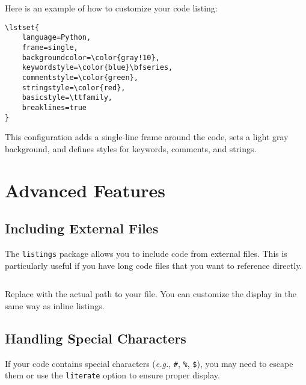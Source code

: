 			Here is an example of how to customize your code listing:

			\begin{lstlisting}[style=LaTeXStyle]
\lstset{
	language=Python,
	frame=single,
	backgroundcolor=\color{gray!10},
	keywordstyle=\color{blue}\bfseries,
	commentstyle=\color{green},
	stringstyle=\color{red},
	basicstyle=\ttfamily,
	breaklines=true
}
			\end{lstlisting}

			This configuration adds a single-line frame around the code, sets a light gray background, and defines styles for keywords, comments, and strings.
			
			
			
			
			



	\section{Advanced Features}

		\subsection{Including External Files}

			The \texttt{listings} package allows you to include code from external files. 
			This is particularly useful if you have long code files that you want to reference directly.

			\begin{lstlisting}[style=LaTeXStyle]

			\end{lstlisting}

			Replace  with the actual path to your file. 
			You can customize the display in the same way as inline listings.


		\subsection{Handling Special Characters}
			If your code contains special characters (\textit{e.g.}, \texttt{\#}, \texttt{\%}, \texttt{\$}), you may need to escape them or use the \texttt{literate} option to ensure proper display.

